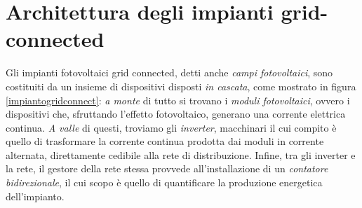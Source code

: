 %
\section{Architettura degli impianti grid-connected}
Gli impianti fotovoltaici grid connected, detti anche \emph{campi fotovoltaici}, 
sono costituiti da un insieme di dispositivi disposti \emph{in cascata}, come mostrato in 
figura \ref{impiantogridconnect}: \emph{a monte} di tutto si trovano i \emph{moduli 
fotovoltaici}, ovvero i dispositivi che, sfruttando l'effetto fotovoltaico, 
generano una corrente elettrica continua. \emph{A valle} di questi, troviamo gli \emph{inverter}, 
macchinari il cui compito \`e quello di trasformare la corrente continua prodotta dai moduli
in corrente alternata, direttamente cedibile alla rete di distribuzione.
%
Infine, tra gli inverter e la rete, il gestore della rete stessa provvede all'installazione 
di un \emph{contatore bidirezionale}, il cui scopo \`e quello di quantificare la produzione 
energetica dell'impianto.
%

